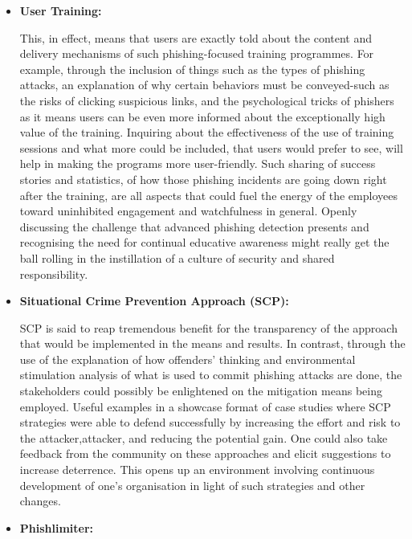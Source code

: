 \begin{itemize}
\item \textbf{User Training:}

This, in effect, means that users are exactly told about the content and delivery mechanisms of such phishing-focused training programmes. For example, through the inclusion of things such as the types of phishing attacks, an explanation of why certain behaviors must be conveyed-such as the risks of clicking suspicious links, and the psychological tricks of phishers as it means users can be even more informed about the exceptionally high value of the training. Inquiring about the effectiveness of the use of training sessions and what more could be included, that users would prefer to see, will help in making the programs more user-friendly. Such sharing of success stories and statistics, of how those phishing incidents are going down right after the training, are all aspects that could fuel the energy of the employees toward uninhibited engagement and watchfulness in general. Openly discussing the challenge that advanced phishing detection presents and recognising the need for continual educative awareness might really get the ball rolling in the instillation of a culture of security and shared responsibility.

\item \textbf{Situational Crime Prevention Approach (SCP):}

SCP is said to reap tremendous benefit for the transparency of the approach that would be implemented in the means and results. In contrast, through the use of the explanation of how offenders' thinking and environmental stimulation analysis of what is used to commit phishing attacks are done, the stakeholders could possibly be enlightened on the mitigation means being employed. Useful examples in a showcase format of case studies where SCP strategies were able to defend successfully by increasing the effort and risk to the attacker,attacker, and reducing the potential gain. One could also take feedback from the community on these approaches and elicit suggestions to increase deterrence. This opens up an environment involving continuous development of one's organisation in light of such strategies and other changes.

\item \textbf{Phishlimiter:}


\end{itemize}
